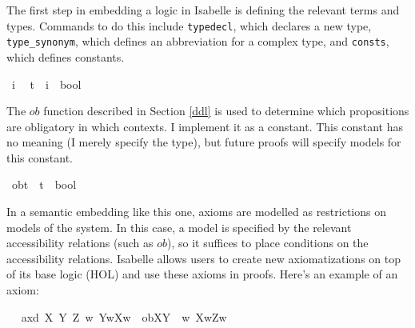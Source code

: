 \begin{isabellebody}
\begin{isamarkuptext}
The first step in embedding a logic in Isabelle is defining the relevant terms and types. Commands
to do this include \texttt{typedecl}, which declares a new type, \texttt{type\_synonym}, which defines
an abbreviation for a complex type, and \texttt{consts}, which defines constants.%
\end{isamarkuptext}\isamarkuptrue%
\isamarkupfalse%
\ i\ %
\isanewline
%
\isanewline
{}\isamarkupfalse%
\ t\ {\isacharequal}\ {\isachardoublequoteopen}{\isacharparenleft}i\ {\isasymRightarrow}\ bool{\isacharparenright}{\isachardoublequoteclose}\ %
\isanewline
%
%
\begin{isamarkuptext}%
The $ob$ function described in Section \ref{ddl} is used to determine which propositions are obligatory
in which contexts. I implement it as a constant. This constant has no meaning (I merely specify the type), 
but future proofs will specify models for this constant.%
\end{isamarkuptext}\isamarkuptrue%
\isamarkupfalse%
\ ob{\isacharcolon}{\isacharcolon}{\isachardoublequoteopen}t\ {\isasymRightarrow}\ {\isacharparenleft}t\ {\isasymRightarrow}\ bool{\isacharparenright}{\isachardoublequoteclose}\ \ %
\isanewline
\ %
%
\begin{isamarkuptext}%
In a semantic embedding like this one, axioms are modelled as restrictions on models of the system. In this case,
a model is specified by the relevant accessibility relations (such as $ob$), so it suffices to place conditions on 
the accessibility relations. Isabelle allows users to create new axiomatizations on top of its base
logic (HOL) and use these axioms in proofs. Here's an example of an axiom:%
\end{isamarkuptext}\isamarkuptrue%
\isamarkupfalse%
\ \isanewline
\ ax{\isacharunderscore}{}d{\isacharcolon}\ {\isachardoublequoteopen}{\isasymforall}X\ Y\ Z{\isachardot}\ {\isacharparenleft}{\isacharparenleft}{\isasymforall}w{\isachardot}\ Y{\isacharparenleft}w{\isacharparenright}{\isasymlongrightarrow}X{\isacharparenleft}w{\isacharparenright}{\isacharparenright}\ {\isasymand}\ ob{\isacharparenleft}X{\isacharparenright}{\isacharparenleft}Y{\isacharparenright}\ {\isasymand}\ {\isacharparenleft}{\isasymforall}w{\isachardot}\ X{\isacharparenleft}w{\isacharparenright}{\isasymlongrightarrow}Z{\isacharparenleft}w{\isacharparenright}{\isacharparenright}{\isacharparenright}\ \isanewline

\end{isabellebody}
